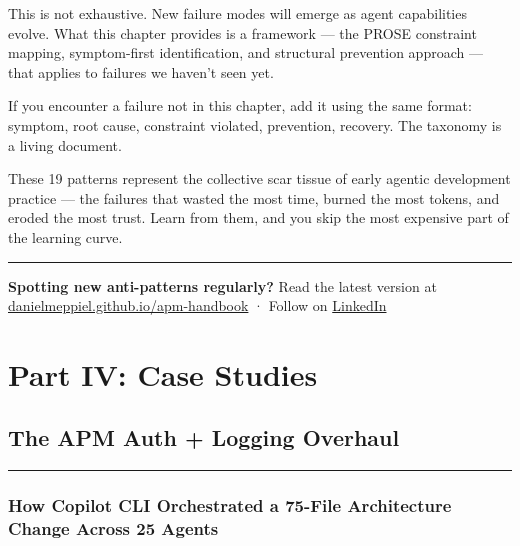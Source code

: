 \documentclass[
  a4paper,
  DIV=11,
  numbers=noendperiod]{scrreprt}
\begin{document}
This is not exhaustive. New failure modes will emerge as agent
capabilities evolve. What this chapter provides is a framework --- the
PROSE constraint mapping, symptom-first identification, and structural
prevention approach --- that applies to failures we haven't seen yet.

If you encounter a failure not in this chapter, add it using the same
format: symptom, root cause, constraint violated, prevention, recovery.
The taxonomy is a living document.

These 19 patterns represent the collective scar tissue of early agentic
development practice --- the failures that wasted the most time, burned
the most tokens, and eroded the most trust. Learn from them, and you
skip the most expensive part of the learning curve.

\begin{center}\rule{0.5\linewidth}{0.5pt}\end{center}

\begin{tcolorbox}[enhanced jigsaw, arc=.35mm, bottomrule=.15mm, breakable, colback=white, colframe=quarto-callout-tip-color-frame, left=2mm, leftrule=.75mm, opacityback=0, rightrule=.15mm, toprule=.15mm]

\textbf{Spotting new anti-patterns regularly?} Read the latest version
at
\href{https://danielmeppiel.github.io/apm-handbook/}{danielmeppiel.github.io/apm-handbook}
· Follow on \href{https://www.linkedin.com/in/danielmeppiel/}{LinkedIn}

\end{tcolorbox}

\part{Part IV: Case Studies}

\chapter{The APM Auth + Logging
Overhaul}\label{the-apm-auth-logging-overhaul}

\begin{center}\rule{0.5\linewidth}{0.5pt}\end{center}

\section{How Copilot CLI Orchestrated a 75-File Architecture Change
Across 25
Agents}\label{how-copilot-cli-orchestrated-a-75-file-architecture-change-across-25-agents}
\end{document}
